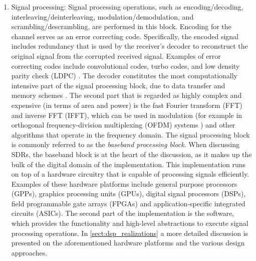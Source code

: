 \begin{enumerate}
  \item Signal processing: Signal processing operations, such as encoding/decoding, interleaving/deinterleaving, modulation/demodulation, and scrambling/descrambling, are performed in this block. Encoding for the channel serves as an error correcting code. Specifically, the encoded signal includes redundancy that is used by the receiver's decoder to reconstruct the original signal from the corrupted received signal. Examples of error correcting codes include convolutional codes, turbo codes, and low density parity check (LDPC) \cite{crc_for_short_control_frames}. The decoder constitutes the most computationally intensive part of the signal processing block, due to data transfer and memory schemes \cite{channel_decoder_architecture}. The second part that is regarded as highly complex and expensive (in terms of area and power) is the fast Fourier transform (FFT) and inverse FFT (IFFT), which can be used in modulation (for example in orthogonal frequency-division multiplexing (OFDM) systems \cite{ofdm_baseband_receiver}) and other algorithms that operate in the frequency domain. The signal processing block is commonly referred to as the \emph{baseband processing block}. When discussing SDRs, the baseband block is at the heart of the discussion, as it makes up the bulk of the digital domain of the implementation. This implementation runs on top of a hardware circuitry that is capable of processing signals efficiently. Examples of these hardware platforms include general purpose processors (GPPs), graphics processing units (GPUs), digital signal processors (DSPs), field programmable gate arrays (FPGAs) and application-specific integrated circuits (ASICs). The second part of the implementation is the software, which provides the functionality and high-level abstractions to execute signal processing operations. In \autoref{sect:dsp_realizations} a more detailed discussion is presented on the aforementioned hardware platforms and the various design approaches.
\end{enumerate}

